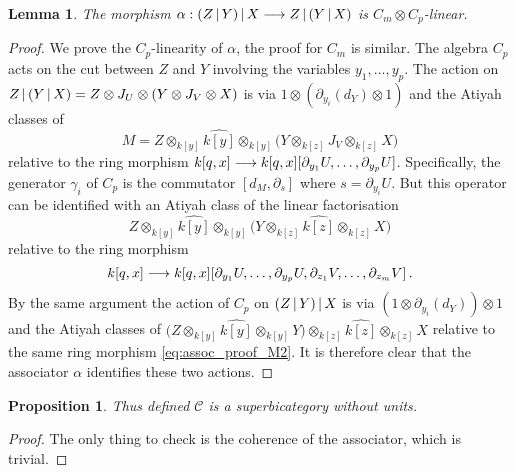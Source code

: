 \documentclass[english,letter paper,12pt,leqno]{article}
\newtheorem{proposition}[theorem]{Proposition}
\newtheorem{lemma}[theorem]{Lemma}
\theoremstyle{example}
\numberwithin{equation}{section}
\def\L{\mathcal{C}}
\def\ferm{\gamma}
\begin{document}
\begin{lemma}\label{lemma:associator} The morphism $\alpha: (Z \,|\, Y) \,|\, X \longrightarrow Z \,|\, (Y \,|\, X)$ is $C_m \otimes C_p$-linear.
\end{lemma}
\begin{proof}
We prove the $C_p$-linearity of $\alpha$, the proof for $C_m$ is similar. The algebra $C_p$ acts on the cut between $Z$ and $Y$ involving the variables $y_1,\ldots,y_p$. The action on $Z \,|\, ( Y \,|\, X ) = Z \otimes J_U \otimes (Y \otimes J_V \otimes X)$ is via $1 \otimes (\partial_{y_i}(d_Y) \otimes 1)$ and the Atiyah classes of 
\[
M = Z \otimes_{k[y]} \widehat{k[y]} \otimes_{k[y]} \big( Y \otimes_{k[z]} J_V \otimes_{k[z]} X \big)
\]
relative to the ring morphism $k[q,x] \longrightarrow k[q,x] [ \partial_{y_1} U, \ldots, \partial_{y_p} U ]$. Specifically, the generator $\ferm_i$ of $C_p$ is the commutator $[d_{M}, \partial_s]$ where $s = \partial_{y_i} U$. But this operator can be identified with an Atiyah class of the linear factorisation
\begin{equation}\label{eq:assoc_proof_M}
Z \otimes_{k[y]} \widehat{k[y]} \otimes_{k[y]} \big( Y \otimes_{k[z]} \widehat{k[z]} \otimes_{k[z]} X \big)
\end{equation}
relative to the ring morphism
\begin{equation}\label{eq:assoc_proof_M2}
k[q,x] \longrightarrow k[q,x] [ \partial_{y_1} U, \ldots, \partial_{y_p} U, \partial_{z_1} V, \ldots, \partial_{z_m} V ]\,.
\end{equation}
By the same argument the action of $C_p$ on $(Z \,|\, Y ) \,|\, X$ is via $(1 \otimes \partial_{y_i}(d_Y)) \otimes 1$ and the Atiyah classes of $\big( Z \otimes_{k[y]} \widehat{k[y]} \otimes_{k[y]} Y \big) \otimes_{k[z]} \widehat{k[z]} \otimes_{k[z]} X$ relative to the same ring morphism \eqref{eq:assoc_proof_M2}. It is therefore clear that the associator $\alpha$ identifies these two actions.
\end{proof}

\begin{proposition} Thus defined $\L$ is a superbicategory without units.
\end{proposition}
\begin{proof}
The only thing to check is the coherence of the associator, which is trivial.
\end{proof}
\end{document}
